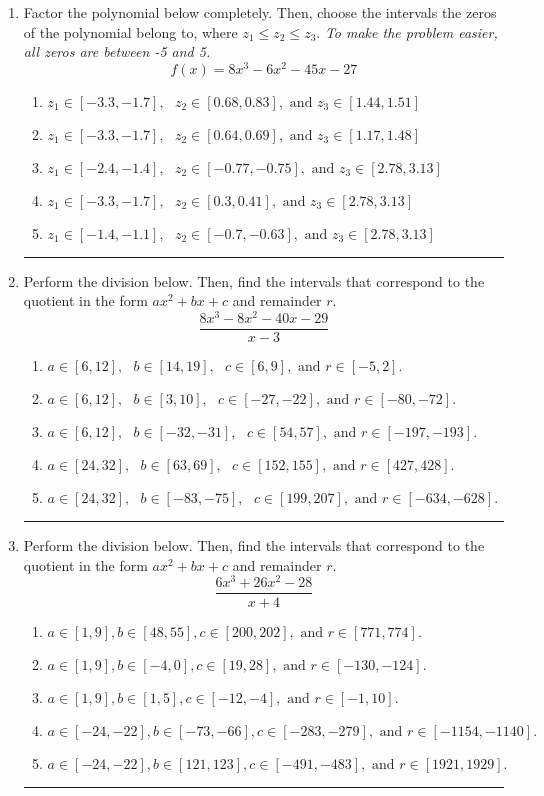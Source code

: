 \documentclass[14pt]{extbook}
\newcommand{\litem}[1]{\item#1\hspace*{-1cm}\rule{\textwidth}{0.4pt}}
\begin{document}
\begin{enumerate}
\litem{
Factor the polynomial below completely. Then, choose the intervals the zeros of the polynomial belong to, where $z_1 \leq z_2 \leq z_3$. \textit{To make the problem easier, all zeros are between -5 and 5.}\[ f(x) = 8x^{3} -6 x^{2} -45 x -27 \]\begin{enumerate}[label=\Alph*.]
\item \( z_1 \in [-3.3, -1.7], \text{   }  z_2 \in [0.68, 0.83], \text{   and   } z_3 \in [1.44, 1.51] \)
\item \( z_1 \in [-3.3, -1.7], \text{   }  z_2 \in [0.64, 0.69], \text{   and   } z_3 \in [1.17, 1.48] \)
\item \( z_1 \in [-2.4, -1.4], \text{   }  z_2 \in [-0.77, -0.75], \text{   and   } z_3 \in [2.78, 3.13] \)
\item \( z_1 \in [-3.3, -1.7], \text{   }  z_2 \in [0.3, 0.41], \text{   and   } z_3 \in [2.78, 3.13] \)
\item \( z_1 \in [-1.4, -1.1], \text{   }  z_2 \in [-0.7, -0.63], \text{   and   } z_3 \in [2.78, 3.13] \)

\end{enumerate} }
\litem{
Perform the division below. Then, find the intervals that correspond to the quotient in the form $ax^2+bx+c$ and remainder $r$.\[ \frac{8x^{3} -8 x^{2} -40 x -29}{x -3} \]\begin{enumerate}[label=\Alph*.]
\item \( a \in [6, 12], \text{   } b \in [14, 19], \text{   } c \in [6, 9], \text{   and   } r \in [-5, 2]. \)
\item \( a \in [6, 12], \text{   } b \in [3, 10], \text{   } c \in [-27, -22], \text{   and   } r \in [-80, -72]. \)
\item \( a \in [6, 12], \text{   } b \in [-32, -31], \text{   } c \in [54, 57], \text{   and   } r \in [-197, -193]. \)
\item \( a \in [24, 32], \text{   } b \in [63, 69], \text{   } c \in [152, 155], \text{   and   } r \in [427, 428]. \)
\item \( a \in [24, 32], \text{   } b \in [-83, -75], \text{   } c \in [199, 207], \text{   and   } r \in [-634, -628]. \)

\end{enumerate} }
\litem{
Perform the division below. Then, find the intervals that correspond to the quotient in the form $ax^2+bx+c$ and remainder $r$.\[ \frac{6x^{3} +26 x^{2} -28}{x + 4} \]\begin{enumerate}[label=\Alph*.]
\item \( a \in [1, 9], b \in [48, 55], c \in [200, 202], \text{ and } r \in [771, 774]. \)
\item \( a \in [1, 9], b \in [-4, 0], c \in [19, 28], \text{ and } r \in [-130, -124]. \)
\item \( a \in [1, 9], b \in [1, 5], c \in [-12, -4], \text{ and } r \in [-1, 10]. \)
\item \( a \in [-24, -22], b \in [-73, -66], c \in [-283, -279], \text{ and } r \in [-1154, -1140]. \)
\item \( a \in [-24, -22], b \in [121, 123], c \in [-491, -483], \text{ and } r \in [1921, 1929]. \)


\end{enumerate}}
\end{enumerate}
\end{document}
